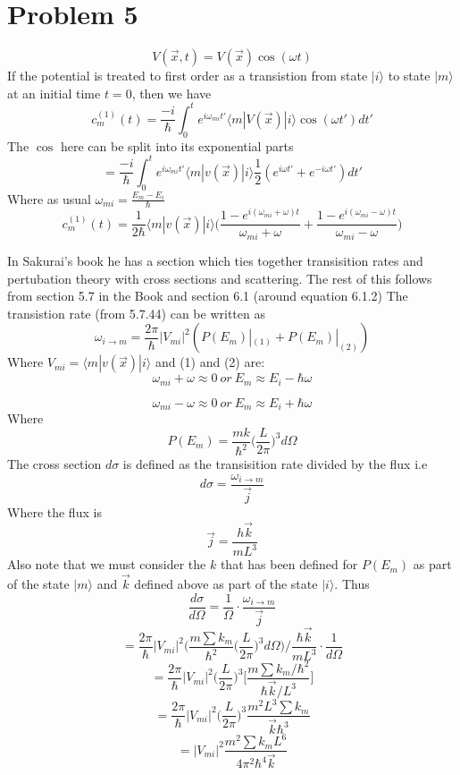 \documentclass[12pt]{article}
\newcommand{\ket}[1]{\vert{#1}\rangle}
\begin{document}
\section*{Problem 5}
$$ V(\vec{x},t) = V(\vec{x}) \cos(\omega t) $$ 
If the potential is treated to first order as a transistion from state $\ket{i}$ to state $\ket{m}$ at an initial time $t=0$, then we have 
$$ c_m^{(1)} (t) = \frac{-i}{\hbar} \int_0^t e^{i \omega_{mi} t'} \langle m | V(\vec{x} ) | i \rangle \cos(\omega t') dt'$$
The $\cos$ here can be split into its exponential parts 
$$ = \frac{-i}{\hbar} \int_0^t e^{i \omega_{mi} t' } \langle m | v(\vec{x} ) | i \rangle \frac{1}{2} (e^{i \omega t'} + e^{-i \omega t'}) dt'  $$
Where as usual $\omega_{mi} = \frac{E_m - E_i}{\hbar} $
$$ c_m^{(1)} (t) = \frac{1}{2 \hbar} \langle m| v(\vec{x}) | i \rangle \Big( \frac{1-e^{i (\omega_{mi} + \omega ) t } }{\omega_{mi} + \omega} + \frac{1-e^{i(\omega_{mi} - \omega) t} }{\omega_{mi} - \omega } \Big) $$

In Sakurai's book he has a section which ties together transisition rates and pertubation theory with cross sections and scattering. The rest of this follows from section 5.7 in the Book and section 6.1 (around equation 6.1.2) 
The transistion rate (from 5.7.44) can be written as 
$$ \omega_{i \to m} = \frac{2 \pi}{\hbar} | V_{mi} |^2 ( P(E_m)|_{(1)} + P(E_m)|_{(2)} ) $$
Where $V_{mi} = \langle m| v(\vec{x}) | i \rangle $ and (1) and (2) are:
\begin{equation}
    \omega_{mi} + \omega \approx 0 \ or \ E_m \approx E_i - \hbar \omega 
\end{equation}

\begin{equation}
    \omega_{mi} - \omega \approx 0 \ or \ E_m \approx E_i + \hbar \omega 
\end{equation}
Where 
$$ P(E_m) = \frac{mk}{\hbar^2} \Big(\frac{L}{2 \pi} \Big)^3 d \Omega $$
The cross section $d \sigma$ is defined as the transisition rate divided by the flux i.e 
$$ d \sigma = \frac{\omega_{i \to m}}{\vec{j}} $$
Where the flux is 
$$ \vec{j} = \frac{h \vec{k} }{m L^3} $$
Also note that we must consider the $k$ that has been defined for $P(E_m)$ as part of the state $\ket{m}$ and $\vec{k}$ defined above as part of the state $\ket{i}$. Thus 
$$ \frac{d \sigma}{d \Omega} = \frac{1}{\Omega} \cdot \frac{\omega_{i \to m}}{\vec{j}} $$
$$ = \frac{2 \pi}{\hbar} |V_{mi} |^2 \Big( \frac{m \sum k_m}{\hbar^2} \Big( \frac{L}{2 \pi} \Big)^3 d \Omega) / \frac{\hbar \vec{k} }{mL^3} \cdot \frac{1}{d \Omega} $$
$$ = \frac{2 \pi}{\hbar} |V_{mi} |^2 \Big( \frac{L}{2 \pi} \Big)^3 \Big[ \frac{m \sum k_m / \hbar^2}{\hbar \vec{k} /L^3} \Big] $$
$$ = \frac{2 \pi}{\hbar} |V_{mi} |^2 \Big( \frac{L}{2 \pi} \Big)^3 \frac{m^2 L^3 \sum k_m}{\vec{k} \hbar^3} $$
$$ = |V_{mi} |^2 \frac{m^2 \sum k_m L^6 }{4 \pi^2 \hbar^4 \vec{k} } $$
\end{document}
